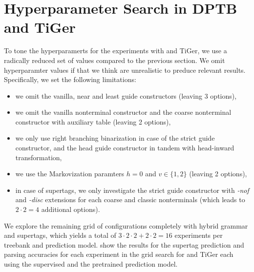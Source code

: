 \documentclass[../../document.tex]{subfiles}
\begin{document}
    \section{Hyperparameter Search in DPTB and TiGer}
    To tone the hyperparamerts for the experiments with  and TiGer, we use a radically reduced set of values compared to the previous section.
    We omit hyperparamter values if that we think are unrealistic to preduce relevant results.
    Specifically, we set the following limitations:
    \begin{itemize}
        \item we omit the vanilla, near and least guide constructors (leaving 3 options),
        \item we omit the vanilla nonterminal constructor and the coarse nonterminal constructor with auxiliary table (leaving 2 options), 
        \item we only use right branching binarization in case of the strict guide constructor, and the head guide constructor in tandem with head-inward transformation,
        \item we use the Markovization paramters \(h = 0\) and \(v \in \{1,2\}\) (leaving 2 options),
        \item in case of  supertags, we only investigate the strict guide constructor with \emph{-nof} and \emph{-disc} extensions for each coarse and classic nonterminals (which leads to $2 \cdot 2 = 4$ additional options).
    \end{itemize}

    We explore the remaining grid of configurations completely with hybrid grammar and  supertags, which yields a total of $3 \cdot 2 \cdot 2 + 2 \cdot 2 = 16$ experiments per treebank and prediction model.
     show the results for the supertag prediction and parsing accuracies for each experiment in the grid search for  and TiGer each using the supervised and the pretrained prediction model.
\end{document}
